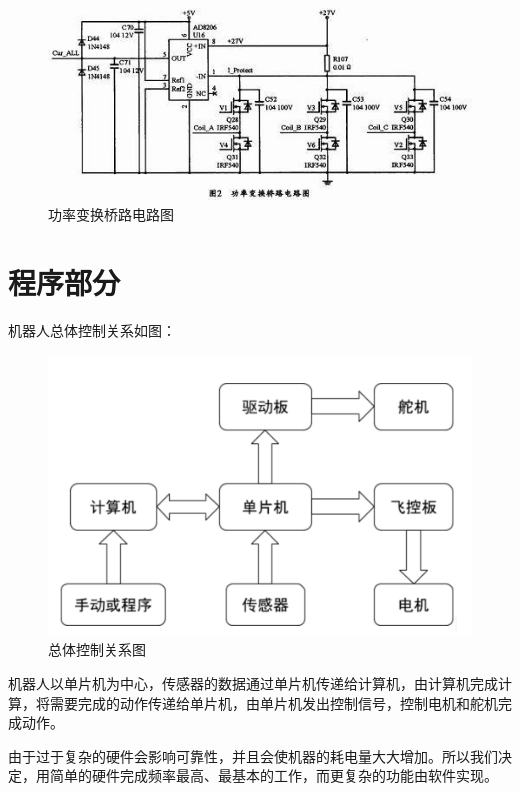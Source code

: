 \documentclass{ctexart}
\begin{document}
\begin{figure}[H]
\centering
    \includegraphics[width = \textwidth]{033}
    \caption{功率变换桥路电路图}\par
\end{figure}
\section{程序部分}
机器人总体控制关系如图：
\begin{figure}[H]
\centering
    \includegraphics[width = \textwidth]{034}
    \caption{总体控制关系图}\par
\end{figure}
机器人以单片机为中心，传感器的数据通过单片机传递给计算机，由计算机完成计算，将需要完成的动作传递给单片机，由单片机发出控制信号，控制电机和舵机完成动作。\par
	由于过于复杂的硬件会影响可靠性，并且会使机器的耗电量大大增加。所以我们决定，用简单的硬件完成频率最高、最基本的工作，而更复杂的功能由软件实现。
\end{document}
